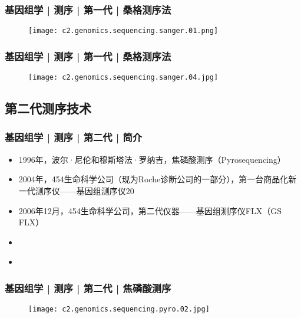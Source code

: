\begin{frame}
  \frametitle{基因组学 | 测序 | 第一代 | 桑格测序法}
  \begin{figure}
    \centering
    \texttt{[image: c2.genomics.sequencing.sanger.01.png]}
  \end{figure}
\end{frame}

\begin{frame}
  \frametitle{基因组学 | 测序 | 第一代 | 桑格测序法}
  \begin{figure}
    \centering
    \texttt{[image: c2.genomics.sequencing.sanger.04.jpg]}
  \end{figure}
\end{frame}

\subsection{第二代测序技术}
\begin{frame}[label=current]
  \frametitle{基因组学 | 测序 | 第二代 | 简介}
  \begin{itemize}
    \item 1996年，波尔·尼伦和穆斯塔法·罗纳吉，焦磷酸测序（Pyrosequencing）
    \item 2004年，454生命科学公司（现为Roche诊断公司的一部分），第一台商品化新一代测序仪——基因组测序仪20
    \item 2006年12月，454生命科学公司，第二代仪器——基因组测序仪FLX（GS FLX）
  \end{itemize}
  \pause
  \begin{itemize}
    \item 
  \end{itemize}
  \pause
  \begin{itemize}
    \item 
  \end{itemize}
\end{frame}


\begin{frame}
  \frametitle{基因组学 | 测序 | 第二代 | 焦磷酸测序}
  \begin{figure}
    \centering
    \texttt{[image: c2.genomics.sequencing.pyro.02.jpg]}
  \end{figure}
\end{frame}


